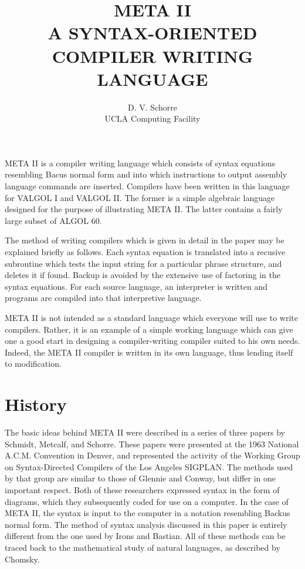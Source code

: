 \documentclass[twocolumn]{article}
\title{META II\\A SYNTAX-ORIENTED COMPILER WRITING LANGUAGE}
\date{}
\author{D. V. Schorre\\UCLA Computing Facility}
\begin{document}
\maketitle

META II is a compiler writing language which consists of syntax equations
resembling Bacus normal form and into which instructions to output
assembly language commands are inserted. Compilers have been written
in this language for VALGOL I and VALGOL II. The former is a simple
algebraic language designed for the purpose of illustrating META II.
The latter contains a fairly large subset of ALGOL 60.

The method of writing compilers which is given in detail in the paper may be
explained briefly as follows.
Each syntax equation is translated into a recusive subroutine which tests the
input string for a particular phrase structure, and deletes it if found.
Backup is avoided by the extensive use of factoring in the syntax equations.
For each source language, an interpreter is written and programs are compiled
into that interpretive language.

META II is not intended as a standard language which everyone will use to write
compilers.
Rather, it is an example of a simple working language which can give one a good
start in designing a compiler-writing compiler suited to his own needs.
Indeed, the META II compiler is written in its own language, thus lending itself
to modification.

\section{History}

The basic ideas behind META II were described in a series of three papers by
Schmidt, Metcalf, and Schorre.
These papers were presented at the 1963 National A.C.M. Convention in Denver,
and represented the activity of the Working Group on Syntax-Directed Compilers
of the Los Angeles SIGPLAN.
The methods used by that group are similar to those of Glennie and Conway, but
differ in one important respect. Both of these researchers expressed syntax in
the form of diagrams, which they subsequently coded for use on a computer.
In the case of META II, the syntax is input to the computer in a notation
resembling Backus normal form.
The method of syntax analysis discussed in this paper is entirely different
from the one used by Irons and Bastian. All of these methods can be traced back
to the mathematical study of natural languages, as described by Chomsky.
\end{document}
